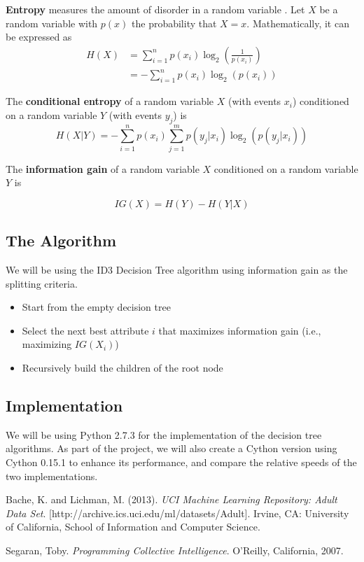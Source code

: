 \documentclass[twocolumn]{article}
\begin{document}
\textbf{Entropy} measures the amount of disorder in a random variable \cite{segaran2007}. Let $X$ be a random variable with $p(x)$ the probability that $X = x$. Mathematically, it can be expressed as 
\begin{align*}
 H(X) &= \sum_{i=1}^{n} p(x_i)\log_{2}\left(\frac{1}{p(x_i)}\right) \\
&= -\sum_{i=1}^{n}p(x_i)\log_{2}\left(p(x_i)\right)
\end{align*}

The \textbf{conditional entropy} of a random variable $X$ (with events $x_i$) conditioned on a random variable $Y$ (with events $y_j$) is
$$ H(X|Y) = -\sum_{i=1}^{n}p(x_i)\sum_{j=1}^{m}p(y_j|x_i)\log_2\left(p(y_j|x_i)\right) $$

The \textbf{information gain} of a random variable $X$ conditioned on a random variable $Y$ is

$$ IG(X) = H(Y) - H(Y|X) $$

\subsection{The Algorithm}

We will be using the ID3 Decision Tree algorithm using information gain as the splitting criteria. 

\begin{itemize}
\item Start from the empty decision tree
\item Select the next best attribute $i$ that maximizes information gain (i.e., maximizing $IG(X_i)$)
\item Recursively build the children of the root node
\end{itemize}

\subsection{Implementation}

We will be using Python 2.7.3 for the implementation of the decision tree algorithms. As part of the project, we will also create a Cython version using Cython 0.15.1 to enhance its performance, and compare the relative speeds of the two implementations.

\begin{thebibliography}{9}

Bache, K. and Lichman, M. (2013). \textsl{UCI Machine Learning Repository: Adult Data Set}. [http://archive.ics.uci.edu/ml/datasets/Adult]. Irvine, CA: University of California, School of Information and Computer Science.

Segaran, Toby. \textsl{Programming Collective Intelligence}. O'Reilly, California, 2007.


\end{thebibliography}
\end{document}
